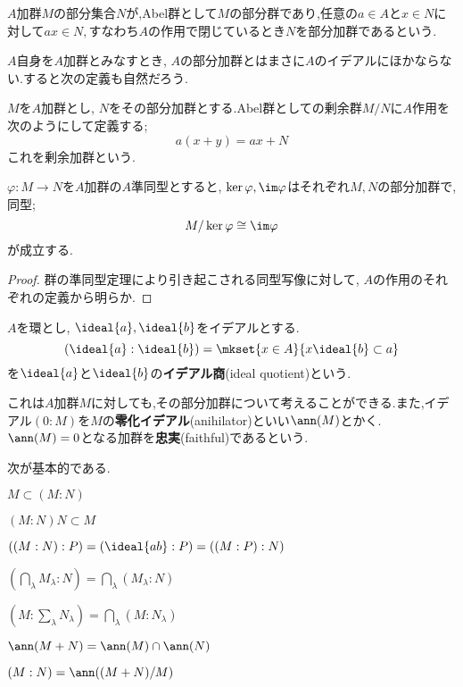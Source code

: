 \begin{defi}[部分加群]
	$A$加群$M$の部分集合$N$が,Abel群として$M$の部分群であり,任意の$a\in A$と$x\in N$に対して$ax\in N, $すなわち$A$の作用で閉じているとき$N$を部分加群であるという.
\end{defi}

$A$自身を$A$加群とみなすとき, $A$の部分加群とはまさに$A$のイデアルにほかならない.すると次の定義も自然だろう.
\begin{defi}[剰余加群]
	$M$を$A$加群とし, $N$をその部分加群とする.Abel群としての剰余群$M/N$に$A$作用を次のようにして定義する;
	\[a(x+y)=ax+N\]
	これを剰余加群という.
\end{defi}

\begin{thm}[準同型定理]
	$\varphi:M\to N$を$A$加群の$A$準同型とすると, $\ker\varphi,\im\varphi$はそれぞれ$M,N$の部分加群で,同型;
	\[M/\ker\varphi\cong\im\varphi\]
	が成立する.
\end{thm}
\begin{proof}
	群の準同型定理により引き起こされる同型写像に対して, $A$の作用のそれぞれの定義から明らか.
\end{proof}

\begin{defi}[イデアル商]
	$A$を環とし, $\ideal{a},\ideal{b}$をイデアルとする.
	\[(\ideal{a}:\ideal{b})=\mkset{x\in A}{x\ideal{b}\subset a}\]
	を$\ideal{a}$と$\ideal{b}$の\textbf{イデアル商}(ideal quotient)という.
\end{defi}

これは$A$加群$M$に対しても,その部分加群について考えることができる.また,イデアル$(0:M)$を$M$の\textbf{零化イデアル}(anihilator)といい$\ann(M)$とかく. $\ann(M)=0$となる加群を\textbf{忠実}(faithful)であるという.

次が基本的である.
\begin{prop}\label{prop:加群商}
	\begin{sakura}
		\item $M\subset(M:N)$
		\item $(M:N)N\subset M$
		\item $((M:N):P)=(\ideal{ab}:P)=((M:P):N)$
		\item $(\bigcap_\lambda M_\lambda:N)=\bigcap_\lambda (M_\lambda:N)$
		\item $(M:\sum_\lambda N_\lambda)=\bigcap_\lambda (M:N_\lambda)$
		\item $\ann (M+N)=\ann (M)\cap\ann (N)$
		\item $(M:N)=\ann((M+N)/M)$
	\end{sakura}
\end{prop}


